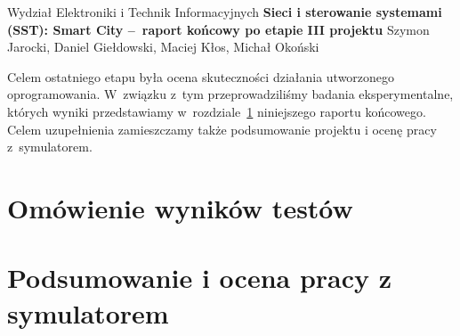\documentclass[11pt, a4paper, twoside]{article}
\begin{document}
	
	\begin{center} 
		{\Large Wydział Elektroniki i Technik Informacyjnych}
		\vskip0.2cm
		{\LARGE \textbf{Sieci i sterowanie systemami (SST): Smart City --~raport końcowy po etapie III projektu } } 
		\vskip0.3cm
		{\Large Szymon Jarocki, Daniel Giełdowski, Maciej Kłos, Michał Okoński}
		\vskip0.8cm
	\end{center} 	
	
Celem ostatniego etapu była ocena skuteczności działania utworzonego oprogramowania. W~związku z~tym przeprowadziliśmy badania eksperymentalne, których wyniki przedstawiamy w~rozdziale~\ref{sec:Wyniki} niniejszego raportu końcowego. Celem uzupełnienia zamieszczamy także podsumowanie projektu i ocenę pracy z~symulatorem.

\section{Omówienie wyników testów}
\label{sec:Wyniki}

\section{Podsumowanie i ocena pracy z symulatorem}
	
	
	
		
\end{document}
